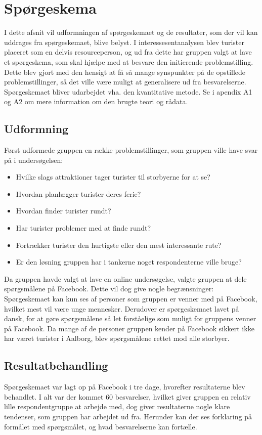 \section{Spørgeskema}
I dette afsnit vil udformningen af spørgeskemaet og de resultater, som der vil kan uddrages fra spørgeskemaet, blive belyst. I interessesentanalysen blev turister placeret som en delvis resourceperson, og ud fra dette har gruppen valgt at lave et spørgeskema, som skal hjælpe med at besvare den initierende problemstilling. Dette blev gjort med den hensigt at få så mange synspunkter på de opstillede problemstillinger, så det ville være muligt at generalisere ud fra besvarelserne. Spørgeskemaet bliver udarbejdet vha. den kvantitative metode. Se i apendix A1 og A2 om mere information om den brugte teori og rådata.

\subsection{Udformning}
Først udformede gruppen en række problemstillinger, som gruppen ville have svar på i undersøgelsen: 
\begin{itemize}
\item Hvilke slags attraktioner tager turister til storbyerne for at se?
\item Hvordan planlægger turister deres ferie?
\item Hvordan finder turister rundt?
\item Har turister problemer med at finde rundt?
\item Fortrækker turister den hurtigste eller den mest interessante rute?
\item Er den løsning gruppen har i tankerne noget respondenterne ville bruge?
\end{itemize}
Da gruppen havde valgt at lave en online undersøgelse, valgte gruppen at dele spørgsmålene på Facebook. Dette vil dog give nogle begrænsninger: Spørgeskemaet kan kun ses af personer som gruppen er venner med på Facebook, hvilket mest vil være unge mennesker. Derudover er spørgeskemaet lavet på dansk, for at gøre spørgsmålene så let forståelige som muligt for gruppens venner på Facebook. Da mange af de personer gruppen kender på Facebook sikkert ikke har været turister i Aalborg, blev spørgsmålene rettet mod alle storbyer.
\subsection{Resultatbehandling}
Spørgeskemaet var lagt op på Facebook i tre dage, hvorefter resultaterne blev behandlet. I alt var der kommet 60 besvarelser, hvilket giver gruppen en relativ lille respondentgruppe at arbejde med, dog giver resultaterne nogle klare tendenser, som gruppen har arbejdet ud fra. Herunder kan der ses forklaring på formålet med spørgsmålet, og hvad besvarelserne kan fortælle.

